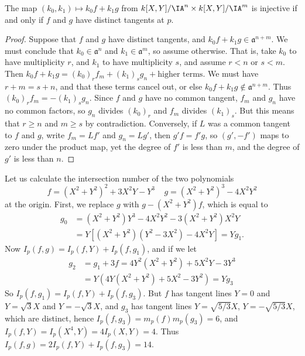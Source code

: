 \begin{lemma}
    The map $(k_0,k_1) \mapsto k_0f + k_1g$ from $k[X,Y]/\IA^n \times k[X,Y]/\IA^m$ is injective if and only if $f$ and $g$ have distinct tangents at $p$.
\end{lemma}
\begin{proof}
    Suppose that $f$ and $g$ have distinct tangents, and $k_0f + k_1g \in \mathfrak{a}^{n+m}$. We must conclude that $k_0 \in \mathfrak{a}^n$ and $k_1 \in \mathfrak{a}^m$, so assume otherwise. That is, take $k_0$ to have multiplicity $r$, and $k_1$ to have multiplicity $s$, and assume $r < n$ or $s < m$. Then $k_0f + k_1g = (k_0)_rf_m + (k_1)_sg_n + \text{higher terms}$. We must have $r + m = s + n$, and that these terms cancel out, or else $k_0f + k_1g \not \in \mathfrak{a}^{n+m}$. Thus $(k_0)_rf_m = -(k_1)_sg_n$. Since $f$ and $g$ have no common tangent, $f_m$ and $g_n$ have no common factors, so $g_n$ divides $(k_0)_r$ and $f_m$ divides $(k_1)_s$. But this means that $r \geq n$ and $m \geq s$ by contradiction. Conversely, if $L$ was a common tangent to $f$ and $g$, write $f_m = Lf'$ and $g_n = Lg'$, then $g'f = f'g$, so $(g',-f')$ maps to zero under the product map, yet the degree of $f'$ is less than $m$, and the degree of $g'$ is less than $n$.
\end{proof}

\begin{example}
    Let us calculate the intersection number of the two polynomials
    \[ f = (X^2 + Y^2)^2 + 3X^2Y - Y^3\ \ \ \ \ g = (X^2 + Y^2)^3 - 4X^2Y^2 \]
    at the origin. First, we replace $g$ with $g-(X^2 + Y^2)f$, which is equal to
    \begin{align*}
        g_0 &= (X^2 + Y^2)Y^3 - 4X^2Y^2 - 3(X^2 + Y^2)X^2Y\\
        &= Y[(X^2 + Y^2)(Y^2 - 3X^2) - 4X^2Y] = Yg_1.
    \end{align*}
    Now $I_p(f,g) = I_p(f,Y) + I_p(f,g_1)$, and if we let
    \begin{align*}
        g_2 &= g_1 + 3f = 4Y^2(X^2 + Y^2) + 5X^2Y - 3Y^3\\
        &= Y(4Y(X^2 + Y^2) + 5X^2 - 3Y^2) = Yg_3
    \end{align*}
    So $I_p(f,g_1) = I_p(f,Y) + I_p(f,g_3)$. But $f$ has tangent lines $Y = 0$ and $Y = \sqrt{3}X$ and $Y = -\sqrt{3}X$, and $g_3$ has tangent lines $Y = \sqrt{5/3}X$, $Y = -\sqrt{5/3}X$, which are distinct, hence $I_p(f,g_3) = m_p(f)m_p(g_3) = 6$, and $I_p(f,Y) = I_p(X^4,Y) = 4I_p(X,Y) = 4$. Thus $I_p(f,g) = 2I_p(f,Y) + I_p(f,g_3) = 14$.
\end{example}

